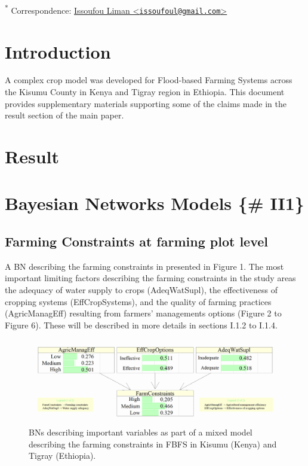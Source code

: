 \documentclass[12pt,oneside]{article}
\begin{document}
\textsuperscript{*} Correspondence: \href{mailto:issoufoul@gmail.com}{Issoufou Liman \textless{}\href{mailto:issoufoul@gmail.com}{\nolinkurl{issoufoul@gmail.com}}\textgreater{}}

\hypertarget{I}{%
\section{Introduction}\label{I}}

A complex crop model was developed for Flood-based Farming Systems across the Kisumu County in Kenya and Tigray region in Ethiopia. This document provides supplementary materials supporting some of the claims made in the result section of the main paper.

\hypertarget{II}{%
\section{Result}\label{II}}

\hypertarget{bayesian-networks-models-ii1}{%
\section{Bayesian Networks Models \{\# II1\}}\label{bayesian-networks-models-ii1}}

\hypertarget{II11}{%
\subsection{Farming Constraints at farming plot level}\label{II11}}

A BN describing the farming constraints in presented in Figure 1. The most important limiting factors describing the farming constraints in the study areas the adequacy of water supply to crops (AdeqWatSupl), the effectiveness of cropping systems (EffCropSystems), and the quality of farming practices (AgricManagEff) resulting from farmers' managements options (Figure 2 to Figure 6). These will be described in more details in sections I.1.2 to I.1.4.

\begin{figure}[!htbp]

{\centering \includegraphics[width=1\linewidth,]{figures/Modelling_FBFS_Suppl_Farming_Constraints_BNs_plot} 

}

\caption{BNs describing important variables as part of a mixed model describing the farming constraints in FBFS in Kisumu (Kenya) and Tigray (Ethiopia).}\label{fig:fig1}
\end{figure}
\end{document}

